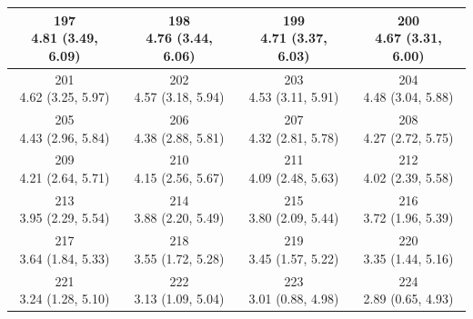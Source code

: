 \begin{table}[htbp]
\begin{tabular}{cccc}
\hline
\shortstack[c]{197\\4.81 (3.49, 6.09)} & \shortstack[c]{198\\4.76 (3.44, 6.06)} & \shortstack[c]{199\\4.71 (3.37, 6.03)} & \shortstack[c]{200\\4.67 (3.31, 6.00)} \\
\hline
\shortstack[c]{201\\4.62 (3.25, 5.97)} & \shortstack[c]{202\\4.57 (3.18, 5.94)} & \shortstack[c]{203\\4.53 (3.11, 5.91)} & \shortstack[c]{204\\4.48 (3.04, 5.88)} \\
\hline
\shortstack[c]{205\\4.43 (2.96, 5.84)} & \shortstack[c]{206\\4.38 (2.88, 5.81)} & \shortstack[c]{207\\4.32 (2.81, 5.78)} & \shortstack[c]{208\\4.27 (2.72, 5.75)} \\
\hline
\shortstack[c]{209\\4.21 (2.64, 5.71)} & \shortstack[c]{210\\4.15 (2.56, 5.67)} & \shortstack[c]{211\\4.09 (2.48, 5.63)} & \shortstack[c]{212\\4.02 (2.39, 5.58)} \\
\hline
\shortstack[c]{213\\3.95 (2.29, 5.54)} & \shortstack[c]{214\\3.88 (2.20, 5.49)} & \shortstack[c]{215\\3.80 (2.09, 5.44)} & \shortstack[c]{216\\3.72 (1.96, 5.39)} \\
\hline
\shortstack[c]{217\\3.64 (1.84, 5.33)} & \shortstack[c]{218\\3.55 (1.72, 5.28)} & \shortstack[c]{219\\3.45 (1.57, 5.22)} & \shortstack[c]{220\\3.35 (1.44, 5.16)} \\
\hline
\shortstack[c]{221\\3.24 (1.28, 5.10)} & \shortstack[c]{222\\3.13 (1.09, 5.04)} & \shortstack[c]{223\\3.01 (0.88, 4.98)} & \shortstack[c]{224\\2.89 (0.65, 4.93)} \\
\hline
\end{tabular}
\end{table}